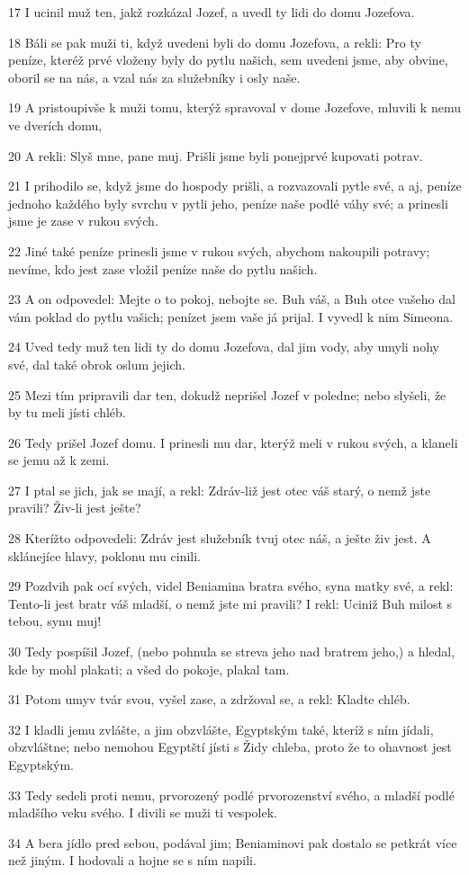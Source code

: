 \par 17 I ucinil muž ten, jakž rozkázal Jozef, a uvedl ty lidi do domu Jozefova.
\par 18 Báli se pak muži ti, když uvedeni byli do domu Jozefova, a rekli: Pro ty peníze, kteréž prvé vloženy byly do pytlu našich, sem uvedeni jsme, aby obvine, oboril se na nás, a vzal nás za služebníky i osly naše.
\par 19 A pristoupivše k muži tomu, kterýž spravoval v dome Jozefove, mluvili k nemu ve dverích domu,
\par 20 A rekli: Slyš mne, pane muj. Prišli jsme byli ponejprvé kupovati potrav.
\par 21 I prihodilo se, když jsme do hospody prišli, a rozvazovali pytle své, a aj, peníze jednoho každého byly svrchu v pytli jeho, peníze naše podlé váhy své; a prinesli jsme je zase v rukou svých.
\par 22 Jiné také peníze prinesli jsme v rukou svých, abychom nakoupili potravy; nevíme, kdo jest zase vložil peníze naše do pytlu našich.
\par 23 A on odpovedel: Mejte o to pokoj, nebojte se. Buh váš, a Buh otce vašeho dal vám poklad do pytlu vašich; penízet jsem vaše já prijal. I vyvedl k nim Simeona.
\par 24 Uved tedy muž ten lidi ty do domu Jozefova, dal jim vody, aby umyli nohy své, dal také obrok oslum jejich.
\par 25 Mezi tím pripravili dar ten, dokudž neprišel Jozef v poledne; nebo slyšeli, že by tu meli jísti chléb.
\par 26 Tedy prišel Jozef domu. I prinesli mu dar, kterýž meli v rukou svých, a klaneli se jemu až k zemi.
\par 27 I ptal se jich, jak se mají, a rekl: Zdráv-liž jest otec váš starý, o nemž jste pravili? Živ-li jest ješte?
\par 28 Kterížto odpovedeli: Zdráv jest služebník tvuj otec náš, a ješte živ jest. A sklánejíce hlavy, poklonu mu cinili.
\par 29 Pozdvih pak ocí svých, videl Beniamina bratra svého, syna matky své, a rekl: Tento-li jest bratr váš mladší, o nemž jste mi pravili? I rekl: Uciniž Buh milost s tebou, synu muj!
\par 30 Tedy pospíšil Jozef, (nebo pohnula se streva jeho nad bratrem jeho,) a hledal, kde by mohl plakati; a všed do pokoje, plakal tam.
\par 31 Potom umyv tvár svou, vyšel zase, a zdržoval se, a rekl: Kladte chléb.
\par 32 I kladli jemu zvlášte, a jim obzvlášte, Egyptským také, kteríž s ním jídali, obzvláštne; nebo nemohou Egyptští jísti s Židy chleba, proto že to ohavnost jest Egyptským.
\par 33 Tedy sedeli proti nemu, prvorozený podlé prvorozenství svého, a mladší podlé mladšího veku svého. I divili se muži ti vespolek.
\par 34 A bera jídlo pred sebou, podával jim; Beniaminovi pak dostalo se petkrát více než jiným. I hodovali a hojne se s ním napili.

